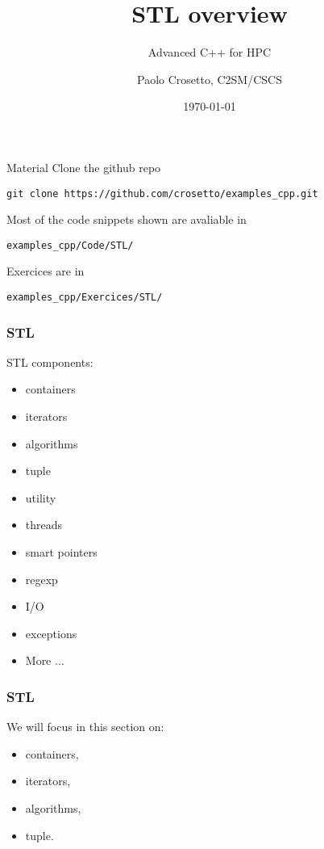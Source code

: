 \documentclass[aspectratio=43]{beamer}
\author{Paolo Crosetto, C2SM/CSCS}
\title{STL overview}
\subtitle{Advanced C++ for HPC}
\date{\today}
\begin{document}
\cscstitle



\begin{frame}[fragile]{Material}
  Clone the github repo
\begin{verbatim}
git clone https://github.com/crosetto/examples_cpp.git
\end{verbatim}
  Most of the code snippets shown are avaliable in
\begin{verbatim}
examples_cpp/Code/STL/
\end{verbatim}
  Exercices are in
\begin{verbatim}
examples_cpp/Exercices/STL/
\end{verbatim}
\end{frame}

\begin{frame}[fragile]\frametitle{STL}
  STL components:
  \begin{itemize}
  \item containers
  \item iterators
  \item algorithms
  \item tuple
  \item utility
  \item threads
  \item smart pointers
  \item regexp
  \item I/O
  \item exceptions
  \item More ...
  \end{itemize}
\end{frame}

\begin{frame}[fragile]\frametitle{STL}
  We will focus in this section on:
  \begin{itemize}
  \item containers,
  \item iterators,
  \item algorithms,
  \item tuple.
  \end{itemize}
\end{frame}
\end{document}
